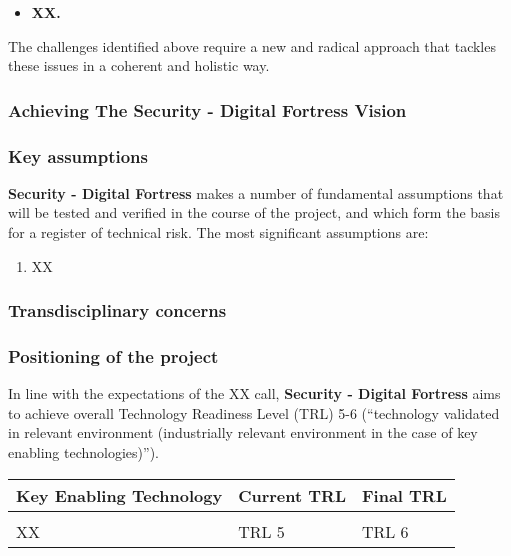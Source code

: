 \documentclass[a4paper,11pt]{article}
\newcommand{\project}[1]{\textbf{#1}\xspace}
\newcommand{\SECURITY}{\project{Security - Digital Fortress}}
\newcommand{\TheProject}{\SECURITY}
\begin{document}
\begin{itemize}
\item \textbf{XX.}
\end{itemize}


The challenges identified above require a new and radical
approach that tackles these issues in a coherent and
holistic way. 

\subsubsection{Achieving The \TheProject{} Vision}


\subsubsection*{Key assumptions}


\TheProject{} makes a number of fundamental assumptions that will be tested and verified in the course of the project,
and which form the basis for a register of technical risk.  The most significant assumptions are:

\begin{enumerate}[{A}1)]
\item XX
\end{enumerate}

\subsubsection*{Transdisciplinary concerns}


\subsubsection{Positioning of the project}

In line with the expectations of the XX call, \TheProject{} aims
to achieve overall Technology Readiness Level (TRL) 5-6 (``technology
validated in relevant environment (industrially relevant environment in
the case of key enabling technologies)'').

\begin{center}
  \begin{tabular}{|p{4.9in}|l|l|}
    \hline
    \textbf{Key Enabling Technology} & \textbf{Current TRL} & \textbf{Final TRL} \\
    \hline
     &  & \\
    \hline XX & TRL 5 & TRL 6 \\  
    \hline
  \end{tabular}
\end{center}
\end{document}
